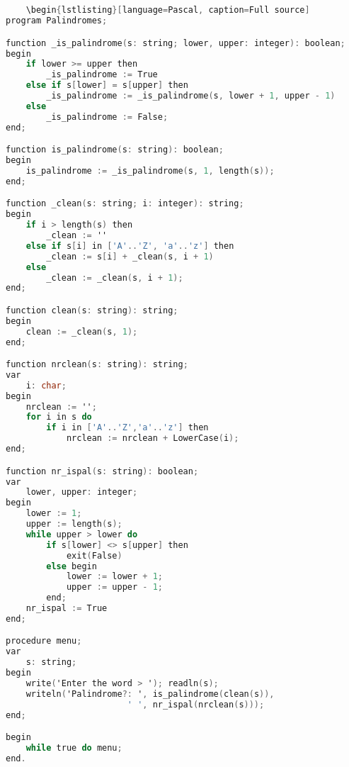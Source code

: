 \documentclass{article}
\begin{document}
\begin{lstlisting}[language=C, caption=palindrome checking in C]


    \begin{lstlisting}[language=Pascal, caption=Full source]
program Palindromes;

function _is_palindrome(s: string; lower, upper: integer): boolean;
begin
    if lower >= upper then
        _is_palindrome := True
    else if s[lower] = s[upper] then
        _is_palindrome := _is_palindrome(s, lower + 1, upper - 1)
    else
        _is_palindrome := False;
end;

function is_palindrome(s: string): boolean;
begin
    is_palindrome := _is_palindrome(s, 1, length(s));
end;

function _clean(s: string; i: integer): string;
begin
    if i > length(s) then
        _clean := ''
    else if s[i] in ['A'..'Z', 'a'..'z'] then
        _clean := s[i] + _clean(s, i + 1)
    else
        _clean := _clean(s, i + 1);
end;

function clean(s: string): string;
begin
    clean := _clean(s, 1);
end;

function nrclean(s: string): string;
var
    i: char;
begin
    nrclean := '';
    for i in s do
        if i in ['A'..'Z','a'..'z'] then
            nrclean := nrclean + LowerCase(i);
end;

function nr_ispal(s: string): boolean;
var
    lower, upper: integer;
begin
    lower := 1;
    upper := length(s);
    while upper > lower do
        if s[lower] <> s[upper] then
            exit(False)
        else begin
            lower := lower + 1;
            upper := upper - 1;
        end;
    nr_ispal := True
end;

procedure menu;
var
    s: string;
begin
    write('Enter the word > '); readln(s);
    writeln('Palindrome?: ', is_palindrome(clean(s)),
                        ' ', nr_ispal(nrclean(s)));
end;

begin
    while true do menu;
end.
    \end{lstlisting}
\end{document}
